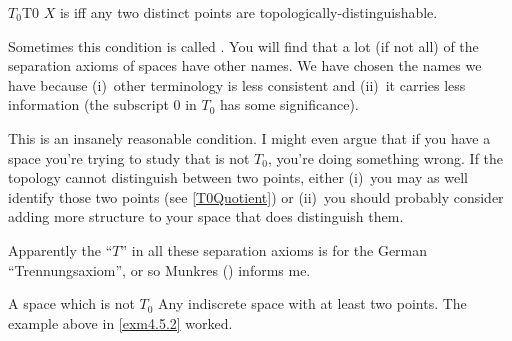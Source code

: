 \begin{dfn}{$T_0$}{T0}
$X$ is  iff any two distinct points are topologically-distinguishable.
\begin{rmk}
Sometimes this condition is called .  You will find that a lot (if not all) of the separation axioms of spaces have other names.  We have chosen the names we have because (i)~other terminology is less consistent and (ii)~it carries less information (the subscript $0$ in $T_0$ has some significance).
\end{rmk}
\begin{rmk}
This is an insanely reasonable condition.  I might even argue that if you have a space you're trying to study that is not $T_0$, you're doing something wrong.  If the topology cannot distinguish between two points, either (i)~you may as well identify those two points (see \cref{T0Quotient}) or (ii)~you should probably consider adding more structure to your space that does distinguish them.
\end{rmk}
\begin{rmk}
Apparently the ``$T$'' in all these separation axioms is for the German ``Trennungsaxiom'', or so Munkres (\cite[pg.~211]{Munkres}) informs me.
\end{rmk}
\end{dfn}
\begin{exm}{A space which is not $T_0$}{}
Any indiscrete space with at least two points.  The example above in \cref{exm4.5.2} worked.
\end{exm}
